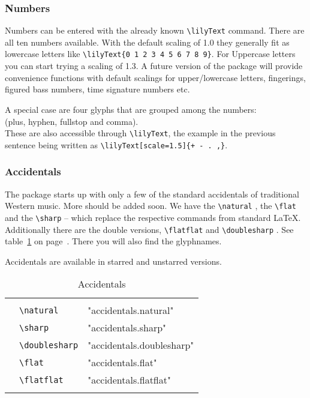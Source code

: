 \documentclass{article}
\newcommand*{\cmd}[1]{\texttt{\textbackslash #1}}
\newcommand{\tmpCaption}{} %
\newcommand{\tmpLabel}{}
\newenvironment{reftable}[2]
	{%
		\renewcommand{\tmpCaption}{#1}
		\renewcommand{\tmpLabel}{#2}
		\begin{table}[ht]
		\begin{center}
		\begin{tabular}[t]{lll}
		\hline
		&\\
	}
	{%
		&\\
		\hline
		\end{tabular}
		\caption{\tmpCaption}
		\label{table:\tmpLabel}
		\end{center}
		\end{table}
	}
\begin{document}
\subsubsection{Numbers}
Numbers can be entered with the already known \cmd{lilyText} command. 
There are all ten numbers available. 
With the default scaling of 1.0 they generally fit as lowercase letters like  \cmd{lilyText\{0 1 2 3 4 5 6 7 8 9\}}. 
For Uppercase letters you can start trying a scaling of 1.3. A future version of the package will provide convenience functions with default scalings for upper/lowercase letters, fingerings, figured bass numbers, time signature numbers etc.

A special case are four glyphs that are grouped among the numbers:\\
 (plus, hyphen, fullstop and comma). \\
These are also accessible through \cmd{lilyText}, the example in the previous sentence being written as \cmd{lilyText[scale=1.5]\{+~-~.~,\}}.

\subsubsection{Accidentals}
The package starts up with only a few of the standard accidentals of traditional Western music. 
More should be added soon. 
We have the \cmd{natural} \natural*, the \cmd{flat} \flat and the \cmd{sharp} \sharp -- which replace the respective commands from standard \LaTeX. 
Additionally there are the double versions, \cmd{flatflat} \flatflat and \cmd{doublesharp} \doublesharp*. See table~\ref{table:accidentals} on page~\pageref{table:accidentals}. 
There you will also find the glyphnames.

Accidentals are available in starred and unstarred versions.

\begin{reftable}{Accidentals}{accidentals}
\natural & \cmd{natural} & "accidentals.natural"\\
\sharp & \cmd{sharp} & "accidentals.sharp"\\
\doublesharp & \cmd{doublesharp} & "accidentals.doublesharp"\\
\flat & \cmd{flat} & "accidentals.flat"\\
\flatflat & \cmd{flatflat} & "accidentals.flatflat"\\
\end{reftable}
\end{document}
